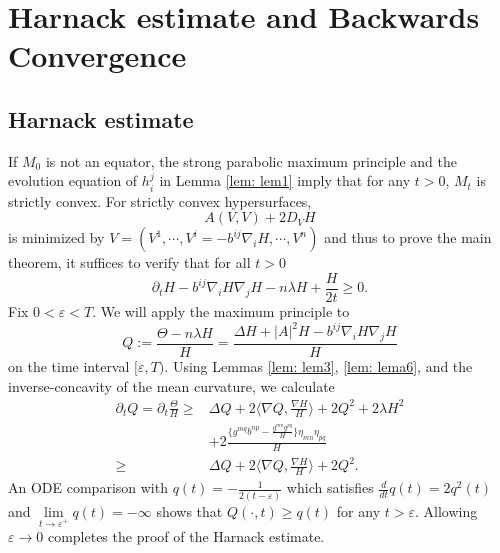 \documentclass{amsart}
\newtheorem{theorem}{Theorem}
\theoremstyle{definition}
\theoremstyle{remark}
\numberwithin{equation}{section}
\begin{document}
\section{Harnack estimate and Backwards Convergence}
\subsection{Harnack estimate}
If $M_0$ is not an equator, the strong parabolic maximum principle and the evolution equation of $h_i^j$ in Lemma \ref{lem: lem1} imply that for any $t>0$, $M_t$ is strictly convex. For strictly convex hypersurfaces, $$A(V,V)+2D_VH$$ is minimized by $V=(V^1,\cdots,V^i=-b^{ij}\nabla_iH,\cdots,V^n)$ and thus to prove the main theorem, it suffices to verify that for all $t>0$
\[\partial_tH-b^{ij}\nabla_iH\nabla_jH-n\lambda H +\frac{H}{2t}\geq 0.\]
Fix $0<\varepsilon<T.$ We will apply the maximum principle to
$$Q:=\frac{\Theta-n\lambda H}{H}=\frac{\Delta H+|A|^2H-b^{ij}\nabla_iH\nabla_jH}{H}$$
on the time interval $[\varepsilon, T).$ Using Lemmas \ref{lem: lem3}, \ref{lem: lema6}, and the inverse-concavity of the mean curvature, we calculate
\begin{align*}
\partial_tQ=\partial_t \frac{\Theta}{H}\geq&\Delta Q+2\langle \nabla Q,\frac{\nabla H}{H}\rangle+ 2Q^2+2\lambda H^2\\
&+2\frac{\{g^{mq}b^{np}-\frac{g^{mn}g^{pq}}{H}\}\eta_{mn}\eta_{pq}}{H}\\
\geq& \Delta Q+2\langle \nabla Q,\frac{\nabla H}{H}\rangle+ 2Q^2.
\end{align*}
An ODE comparison with $q(t)=-\frac{1}{2(t-\varepsilon)}$ which satisfies $\frac{d}{dt}q(t)=2q^2(t)$ and $\lim\limits_{t\to \varepsilon^+}q(t)=-\infty$ shows that $Q(\cdot,t)\geq q(t)$ for any $t>\varepsilon.$ Allowing $\varepsilon\to 0$ completes the proof of the Harnack estimate.
\end{document}
